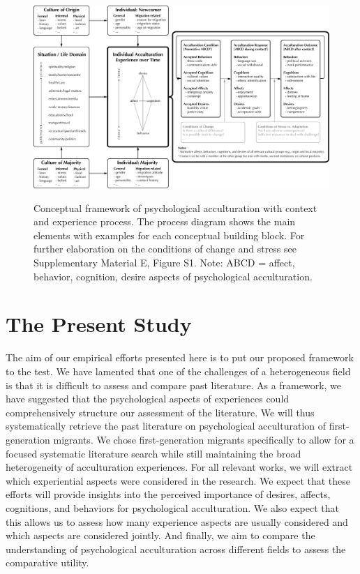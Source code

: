 \documentclass[man, 12pt, a4paper, mask]{apa7}
\newcommand\Warning[1][2ex]{%
  \renewcommand\stacktype{L}%
  \scaleto{\stackon[1.3pt]{\color{red}$\triangle$}{\tiny\bfseries !}}{#1}}%
\begin{document}
\begin{figure}
    \centering
    \caption{Conceptual framework of psychological acculturation with context and experience process. The process diagram shows the main elements with examples for each conceptual building block. For further elaboration on the conditions of change and stress see Supplementary Material E, Figure S1. Note: ABCD = affect, behavior, cognition, desire aspects of psychological acculturation.}
    \includegraphics[width=\textwidth]{Figures/ConceptualFrameworkExpandedOptima_short.pdf}
    \label{fig:ModelContext}
\end{figure}

\section{The Present Study}


The aim of our empirical efforts presented here is to put our proposed framework to the test. We have lamented that one of the challenges of a heterogeneous field is that it is difficult to assess and compare past literature. As a framework, we have suggested that the psychological aspects of experiences could comprehensively structure our assessment of the literature. We will thus systematically retrieve the past literature on psychological acculturation of first-generation migrants. We chose first-generation migrants specifically to allow for a focused systematic literature search while still maintaining the broad heterogeneity of acculturation experiences. For all relevant works, we will extract which experiential aspects were considered in the research. We expect that these efforts will provide insights into the perceived importance of desires, affects, cognitions, and behaviors for psychological acculturation. We also expect that this allows us to assess how many experience aspects are usually considered and which aspects are considered jointly. And finally, we aim to compare the understanding of psychological acculturation across different fields to assess the comparative utility. 
\end{document}
